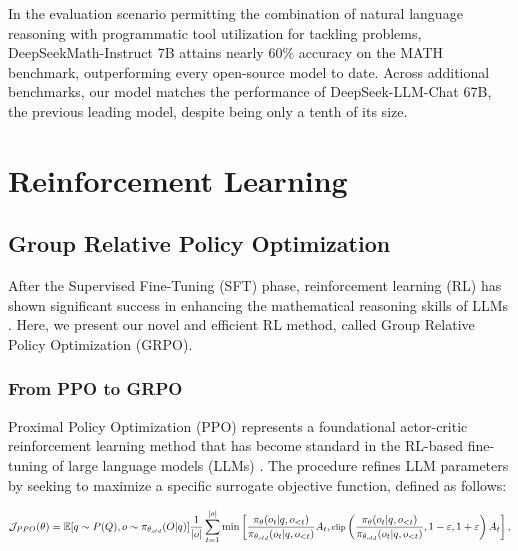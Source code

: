 \begin{itemize}[topsep=0pt]
\begin{itemize}[topsep=0pt]
In the evaluation scenario permitting the combination of natural language reasoning with programmatic tool utilization for tackling problems, DeepSeekMath-Instruct 7B attains nearly 60\% accuracy on the MATH benchmark, outperforming every open-source model to date. Across additional benchmarks, our model matches the performance of DeepSeek-LLM-Chat 67B, the previous leading model, despite being only a tenth of its size.
\section{Reinforcement Learning}

\subsection{Group Relative Policy Optimization} After the Supervised Fine-Tuning (SFT) phase, reinforcement learning (RL) has shown significant success in enhancing the mathematical reasoning skills of LLMs \citep{wang2023math,wizardmath}. Here, we present our novel and efficient RL method, called Group Relative Policy Optimization (GRPO).

\subsubsection{From PPO to GRPO} Proximal Policy Optimization (PPO) \citep{schulman2017proximal} represents a foundational actor-critic reinforcement learning method that has become standard in the RL-based fine-tuning of large language models (LLMs) \citep{ouyang2022training}. The procedure refines LLM parameters by seeking to maximize a specific surrogate objective function, defined as follows:

\begin{equation}
\footnotesize
    \mathcal{J}_{PPO}(\theta) = \mathbb{E}{[q \sim P(Q), o \sim \pi_{\theta_{old}}(O|q)]} \frac{1}{|o|} \sum_{t=1}^{|o|} \min \left[ \frac{\pi_\theta(o_{t} | q, o_{<t})}{\pi_{\theta_{old}}(o_{t} | q, o_{<t})} A_{t}, \text{clip} \left( \frac{\pi_\theta(o_{t} | q, o_{<t})}{\pi_{\theta_{old}}(o_{t} | q, o_{<t})}, 1 - \varepsilon, 1 + \varepsilon \right)  A_{t} \right] ,
\end{equation}


\end{itemize}
\end{itemize}
